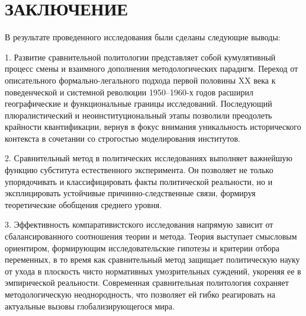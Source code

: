 \section*{ЗАКЛЮЧЕНИЕ}

В результате проведенного исследования были сделаны следующие выводы:

1. Развитие сравнительной политологии представляет собой кумулятивный процесс смены и взаимного дополнения методологических парадигм. Переход от описательного формально-легального подхода первой половины XX века к поведенческой и системной революции 1950--1960-х годов расширил географические и функциональные границы исследований. Последующий плюралистический и неоинституциональный этапы позволили преодолеть крайности квантификации, вернув в фокус внимания уникальность исторического контекста в сочетании со строгостью моделирования институтов.

2. Сравнительный метод в политических исследованиях выполняет важнейшую функцию субститута естественного эксперимента. Он позволяет не только упорядочивать и классифицировать факты политической реальности, но и эксплицировать устойчивые причинно-следственные связи, формируя теоретические обобщения среднего уровня.

3. Эффективность компаративистского исследования напрямую зависит от сбалансированного соотношения теории и метода. Теория выступает смысловым ориентиром, формирующим исследовательские гипотезы и критерии отбора переменных, в то время как сравнительный метод защищает политическую науку от ухода в плоскость чисто нормативных умозрительных суждений, укореняя ее в эмпирической реальности. Современная сравнительная политология сохраняет методологическую неоднородность, что позволяет ей гибко реагировать на актуальные вызовы глобализирующегося мира.